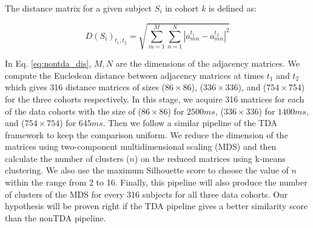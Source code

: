 The distance matrix for a given subject $S_i$ in cohort $k$ is defined as:

\begin{equation}
D(S_i)_{t_1,t_2} = \sqrt{\sum_{m=1}^{M} \sum_{n=1}^{N} |a_{mn}^{t_1} - a_{mn}^{t_2}|^2}
\label{eq:nontda_dis}
\end{equation}

In Eq. \ref{eq:nontda_dis}, $M, N$ are the dimensions of the adjacency matrices. We compute the Eucledean distance between adjacency matrices at times $t_1$ and $t_2$ which gives 316 distance matrices of sizes ($86 \times 86$), ($336 \times 336$), and ($754 \times 754$) for the three cohorts respectively. In this stage, we acquire 316 matrices for each of the data cohorts with the size of ($86 \times 86$) for $2500ms$,  ($336 \times 336$) for $1400ms$, and ($754 \times 754$) for $645ms$. Then we follow a similar pipeline of the TDA framework to keep the comparison uniform. We reduce the dimension of the matrices using two-component multidimensional scaling (MDS) and then calculate the number of clusters ($n$) on the reduced matrices using k-means clustering. We also use the maximum Silhouette score to choose the value of $n$ within the range from 2 to 16. Finally, this pipeline will also produce the number of clusters of the MDS for every 316 subjects for all three data cohorts. Our hypothesis will be proven right if the TDA pipeline gives a better similarity score than the nonTDA pipeline. 